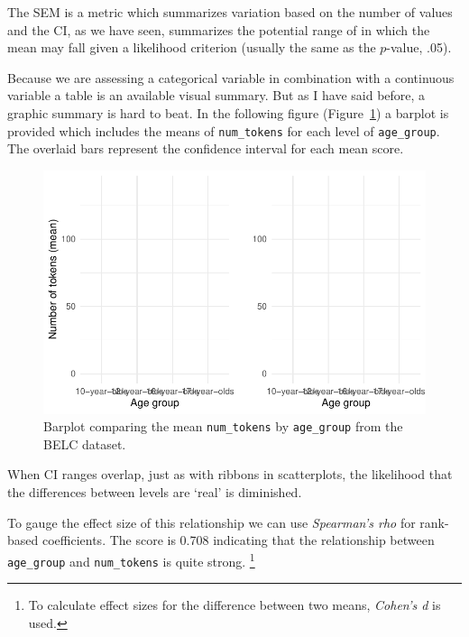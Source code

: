 \documentclass[
  letterpaper,
]{scrbook}
\begin{document}
The SEM is a metric which summarizes variation based on the number of
values and the CI, as we have seen, summarizes the potential range of in
which the mean may fall given a likelihood criterion (usually the same
as the \(p\)-value, .05).

Because we are assessing a categorical variable in combination with a
continuous variable a table is an available visual summary. But as I
have said before, a graphic summary is hard to beat. In the following
figure (Figure~\ref{fig-summaries-bivariate-barplot-belc}) a barplot is
provided which includes the means of \texttt{num\_tokens} for each level
of \texttt{age\_group}. The overlaid bars represent the confidence
interval for each mean score.

\begin{figure}[h]

{\centering \includegraphics{./approaching-analysis_files/figure-pdf/fig-summaries-bivariate-barplot-belc-1.pdf}

}

\caption{\label{fig-summaries-bivariate-barplot-belc}Barplot comparing
the mean \texttt{num\_tokens} by \texttt{age\_group} from the BELC
dataset.}

\end{figure}

When CI ranges overlap, just as with ribbons in scatterplots, the
likelihood that the differences between levels are `real' is diminished.

To gauge the effect size of this relationship we can use
\emph{Spearman's rho} for rank-based coefficients. The score is 0.708
indicating that the relationship between \texttt{age\_group} and
\texttt{num\_tokens} is quite strong. \footnote{To calculate effect
  sizes for the difference between two means, \emph{Cohen's d} is used.}
\end{document}
